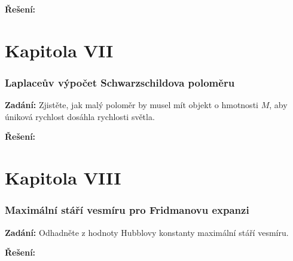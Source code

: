 \documentclass{article}
\begin{document}
\textbf{Řešení:}

\part*{Kapitola \textrm{V\hspace{-.1em}I\hspace{-.1em}I}}

\section*{Laplaceův výpočet Schwarzschildova poloměru}
\textbf{Zadání:}  Zjistěte, jak malý poloměr by musel mít objekt o hmotnosti $M$, aby úniková rychlost
dosáhla rychlosti světla.

\textbf{Řešení:}

\part*{Kapitola \textrm{V\hspace{-.1em}I\hspace{-.1em}I\hspace{-.1em}I}}

\section*{Maximální stáří vesmíru pro Fridmanovu expanzi}
\textbf{Zadání:}  Odhadněte z hodnoty Hubblovy konstanty maximální stáří vesmíru.

\textbf{Řešení:}
\end{document}
